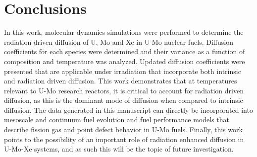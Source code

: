 \documentclass[10pt,review]{elsarticle}
\begin{document}

\section{Conclusions}

In this work, molecular dynamics simulations were performed to determine the radiation driven diffusion of U, Mo and Xe in U-Mo nuclear fuels. Diffusion coefficients for each species were determined and their variance as a function of composition and temperature was analyzed. Updated diffusion coefficients were presented that are applicable under irradiation that incorporate both intrinsic and radiation driven diffusion. This work demonstrates that at temperatures relevant to U-Mo research reactors, it is critical to account for radiation driven diffusion, as this is the dominant mode of diffusion when compared to intrinsic diffusion. The data generated in this manuscript can directly be incorporated into mesoscale and continuum fuel evolution and fuel performance models that describe fission gas and point defect behavior in U-Mo fuels. Finally, this work points to the possibility of an important role of radiation enhanced diffusion in U-Mo-Xe systems, and as such this will be the topic of future investigation. 
\end{document}
